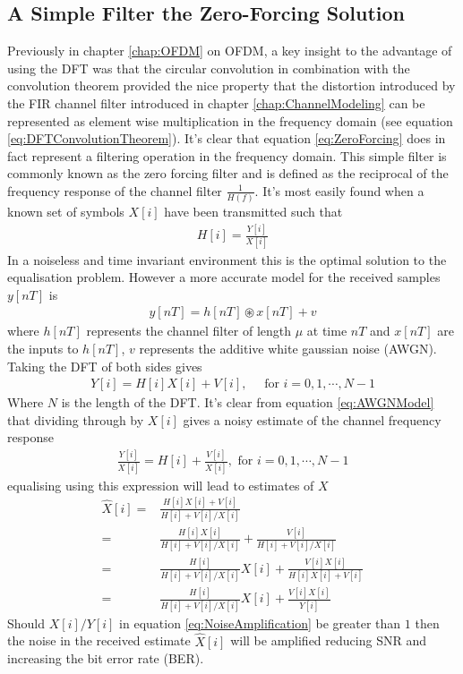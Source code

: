 \subsection{A Simple Filter the Zero-Forcing Solution}
\label{subsec:ZeroForcing}
Previously in chapter \ref{chap:OFDM} on OFDM, a key insight to %
the advantage of using the DFT was that the circular convolution %
in combination with the convolution theorem provided the nice %
property that the distortion introduced by the FIR channel filter %
introduced in chapter \ref{chap:ChannelModeling} can be represented %
as element wise multiplication in the frequency domain (see equation %
\ref{eq:DFTConvolutionTheorem}). It's clear that equation %
\ref{eq:ZeroForcing} does in fact represent a filtering operation %
in the frequency domain. This simple filter is commonly known as %
the zero forcing filter and is defined as the reciprocal of the %
frequency response of the channel filter $\frac{1}{H(f)}$. %
It's most easily found when a known set of symbols $X[i]$ have %
been transmitted such that
\begin{align}
	H\left[i\right] = \frac{Y\left[i\right]}{X\left[i\right]}
\end{align}
In a noiseless and time invariant environment this is the optimal %
solution to the equalisation problem. However a more accurate %
model for the received samples $y[nT]$ is
\begin{align}
	y[nT]=h[nT]\circledast x[nT]%
	+ v
\end{align}
where $h[nT]$ represents the channel filter of length %
$\mu$ at time $nT$ and $x[nT]$ are the inputs to %
$h[nT]$, $v$ represents the additive white gaussian %
noise (AWGN). Taking the DFT of both sides gives %
\begin{align}
	Y[i] = H[i]X[i] + V[i]%
	,\quad \text{ for } i = 0,1,\cdots,N-1
	\label{eq:AWGNModel}
\end{align}
Where $N$ is the length of the DFT. It's clear from %
equation \ref{eq:AWGNModel} that dividing through %
by $X[i]$ gives a noisy estimate of the channel %
frequency response
\begin{align}
	\frac{Y[i]}{X[i]} = H[i] + \frac{V[i]}{X[i]}, %
	\text{ for } i = 0,1,\cdots,N-1
\end{align}
equalising using this expression will lead to estimates %
of $X$
\begin{align}
	\hat{X}[i] =& \frac{H[i]X[i]+V[i]}{H[i]+V[i]/X[i]} \\
	=& \frac{H[i]X[i]}{H[i]+V[i]/X[i]} + \frac{V[i]}{H[i]
	+ V[i]/X[i]} \\
	=& \frac{H[i]}{H[i]+V[i]/X[i]}X[i] + 
	\frac{V[i]X[i]}{H[i]X[i]+V[i]}\\
	=& \frac{H[i]}{H[i]+V[i]/X[i]}X[i] + 
	\frac{V[i]X[i]}{Y[i]}
	\label{eq:NoiseAmplification}
\end{align}
Should $X[i]/Y[i]$ in equation \ref{eq:NoiseAmplification} %
be greater than $1$ then the noise in the received estimate %
$\hat{X}[i]$ will be amplified reducing SNR and increasing the bit %
error rate (BER).

